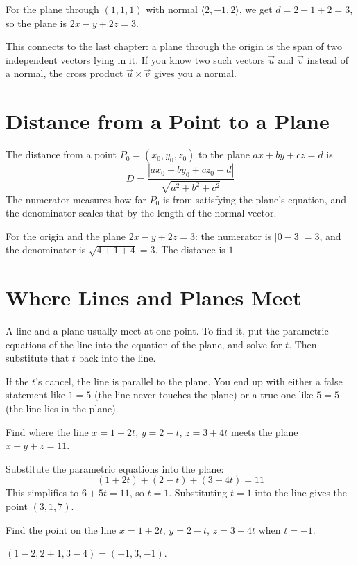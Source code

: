 For the plane through $(1, 1, 1)$ with normal $\langle 2, -1, 2\rangle$, we get
$d = 2 - 1 + 2 = 3$, so the plane is $2x - y + 2z = 3$.

This connects to the last chapter: a plane through the origin is the span
of two independent vectors lying in it. If you know two such vectors
$\vec{u}$ and $\vec{v}$ instead of a normal, the cross product $\vec{u}
\times \vec{v}$ gives you a normal.

\section{Distance from a Point to a Plane}
The distance from a point $P_0 = (x_0, y_0, z_0)$ to the plane $ax + by + cz = d$ is
$$D = \frac{|ax_0 + by_0 + cz_0 - d|}{\sqrt{a^2 + b^2 + c^2}}$$
The numerator measures how far $P_0$ is from satisfying the plane's equation,
and the denominator scales that by the length of the normal vector.

For the origin and the plane $2x - y + 2z = 3$: the numerator is $|0 - 3| = 3$, and
the denominator is $\sqrt{4 + 1 + 4} = 3$. The distance is $1$.

\section{Where Lines and Planes Meet}
A line and a plane usually meet at one point. To find it, put the parametric
equations of the line into the equation of the plane, and solve for $t$. Then
substitute that $t$ back into the line.

If the $t$'s cancel, the line is parallel to the plane. You end up with
either a false statement like $1 = 5$ (the line never touches the plane)
or a true one like $5 = 5$ (the line lies in the plane).

\begin{Worked}
\begin{Problem}
Find where the line $x = 1 + 2t$, $y = 2 - t$, $z = 3 + 4t$ meets the plane $x + y + z = 11$.
\end{Problem}
\begin{Solution}
Substitute the parametric equations into the plane:
$$(1 + 2t) + (2 - t) + (3 + 4t) = 11$$
This simplifies to $6 + 5t = 11$, so $t = 1$. Substituting $t = 1$ into the line gives the point $(3, 1, 7)$.
\end{Solution}
\end{Worked}

\begin{Exercise}[label=lp1, title=A point on a line]
Find the point on the line $x = 1 + 2t$, $y = 2 - t$, $z = 3 + 4t$ when $t = -1$.
\end{Exercise}
\begin{Answer}[ref=lp1]
$(1 - 2, 2 + 1, 3 - 4) = (-1, 3, -1)$.
\end{Answer}

